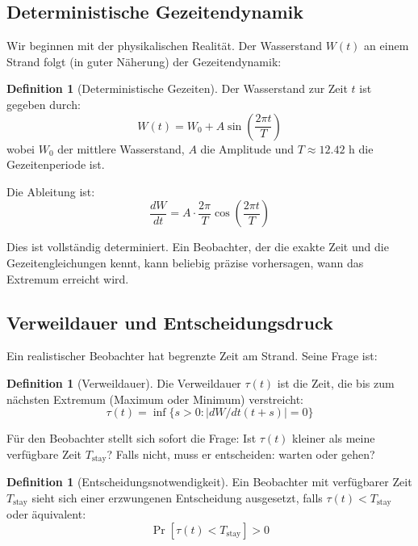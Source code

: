 \documentclass[a4paper, 12pt, twoside, openright]{report}
\theoremstyle{definition}
\newtheorem{definition}[theorem]{Definition}
\theoremstyle{definition}
\begin{document}
\subsection{Deterministische Gezeitendynamik}

Wir beginnen mit der physikalischen Realität. Der Wasserstand $W(t)$ an einem Strand folgt (in guter Näherung) der Gezeitendynamik:

\begin{definition}[Deterministische Gezeiten]
    Der Wasserstand zur Zeit $t$ ist gegeben durch:
    \begin{equation}
        W(t) = W_0 + A \sin\left(\frac{2\pi t}{T}\right)
    \end{equation}
    wobei $W_0$ der mittlere Wasserstand, $A$ die Amplitude und $T \approx 12.42$ h die Gezeitenperiode ist.
\end{definition}

Die Ableitung ist:
\begin{equation}
    \frac{dW}{dt} = A \cdot \frac{2\pi}{T} \cos\left(\frac{2\pi t}{T}\right)
\end{equation}

Dies ist vollständig determiniert. Ein Beobachter, der die exakte Zeit und die Gezeitengleichungen kennt, kann beliebig präzise vorhersagen, wann das Extremum erreicht wird.

\subsection{Verweildauer und Entscheidungsdruck}

Ein realistischer Beobachter hat begrenzte Zeit am Strand. Seine Frage ist:

\begin{definition}[Verweildauer]
    Die Verweildauer $\tau(t)$ ist die Zeit, die bis zum nächsten Extremum (Maximum oder Minimum) verstreicht:
    \begin{equation}
        \tau(t) = \inf\{s > 0 : |dW/dt(t+s)| = 0\}
    \end{equation}
\end{definition}

Für den Beobachter stellt sich sofort die Frage: Ist $\tau(t)$ kleiner als meine verfügbare Zeit $T_{\text{stay}}$? Falls nicht, muss er entscheiden: warten oder gehen?

\begin{definition}[Entscheidungsnotwendigkeit]
    Ein Beobachter mit verfügbarer Zeit $T_{\text{stay}}$ sieht sich einer erzwungenen Entscheidung ausgesetzt, falls $\tau(t) < T_{\text{stay}}$ oder äquivalent:
    \begin{equation}
        \Pr[\tau(t) < T_{\text{stay}}] > 0
    \end{equation}
\end{definition}
\end{document}
